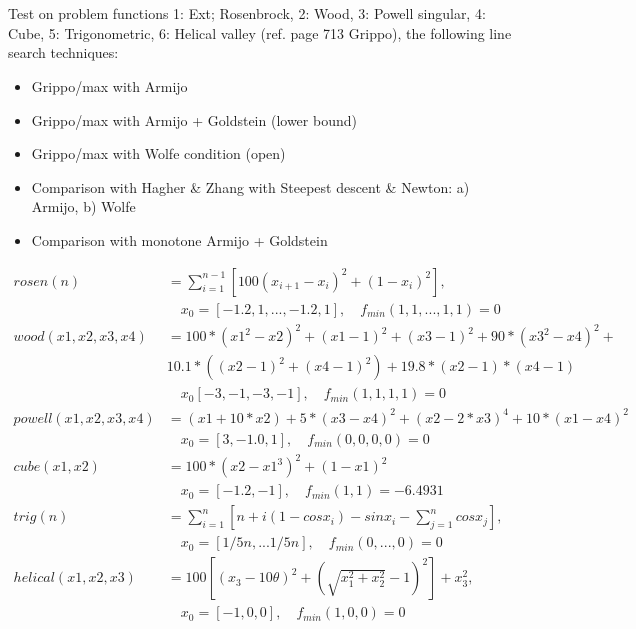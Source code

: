 \documentclass[a4paper,11pt]{article}
\numberwithin{equation}{section} %
\begin{document}
\section{}

Test on problem functions 1: Ext; Rosenbrock, 2: Wood, 3: Powell singular, 4: Cube, 5: Trigonometric, 6: Helical valley (ref. page 713 Grippo), the following line search techniques:

\begin{itemize}
    \item Grippo/max with Armijo
    \item Grippo/max with Armijo + Goldstein (lower bound)
    \item Grippo/max with Wolfe condition (open)
    \item Comparison with Hagher \& Zhang with Steepest descent \& Newton: a) Armijo, b) Wolfe
    \item Comparison with monotone Armijo + Goldstein
\end{itemize}

\begin{align*}
    rosen(n) &= \sum_{i=1}^{n-1} [100 (x_{i+1}-x_i)^2 + (1-x_i)^2], \\ &\quad x_0 = [-1.2,1,...,-1.2,1], \quad f_{min}(1,1,...,1,1)=0  \\
    wood(x1,x2,x3,x4) &= 100*(x1^2-x2)^2 + (x1-1)^2 + (x3-1)^2 + 90*(x3^2 - x4)^2 + \\ & 10.1*((x2-1)^2 + (x4-1)^2) + 19.8*(x2-1)*(x4-1)\\ & \quad x_0 [-3,-1,-3,-1], \quad f_{min}(1,1,1,1) = 0 \\
    powell(x1,x2,x3,x4) &= (x1+10*x2) + 5*(x3-x4)^2 + (x2-2*x3)^4 + 10*(x1-x4)^2 \\ & \quad x_0 = [3,-1.0,1], \quad f_{min}(0,0,0,0) = 0 \\
    cube(x1,x2) &= 100*(x2-x1^3)^2 + (1-x1)^2 \\ & \quad x_0 = [-1.2,-1], \quad f_{min}(1,1) = -6.4931 \\
    trig(n) &= \sum_{i=1}^{n}[n + i(1-cosx_i) - sinx_i - \sum_{j=1}^{n}cosx_j],\\ & \quad x_0 = [1/5n,...1/5n], \quad f_{min}(0,...,0) = 0 \\
    helical(x1,x2,x3) &= 100[(x_3-10\theta)^2 + (\sqrt{x_1^2+x_2^2}-1)^2] + x_3^2, \\ & \quad x_0 = [-1,0,0], \quad f_{min}(1,0,0) = 0 \\
\end{align*}
\end{document}
